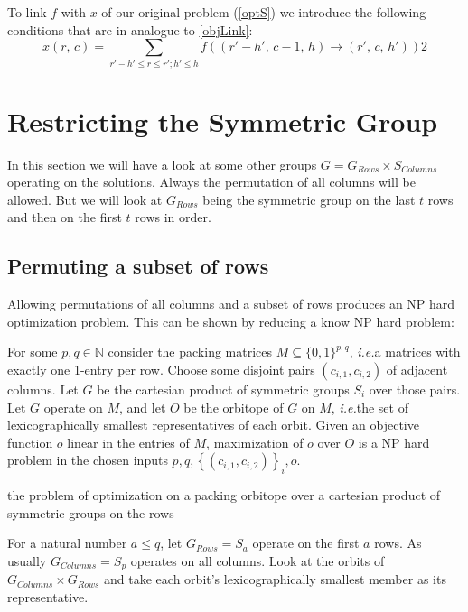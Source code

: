 \documentclass{amsart}
\theoremstyle{definition}
\def\ie{\emph{i.e.}}
\newcommand{\lr}[1]{\ensuremath{\left( #1 \right)}}
\newcommand{\lrM}[1]{\ensuremath{\left\{ #1 \right\}}}
\newcommand{\Naturals}{\ensuremath{\mathbb{N}}}
\begin{document}


To link \(f\) with \(x\) of our original problem (\ref{optS}) we
introduce the following conditions that are in analogue to \ref{objLink}:
\begin{equation}
  x \left( r,\, c \right) =
  \sum_{r' - h' \leq r \leq r'; h' \leq h} f\left(\left(r'-h',\, c-1,\, h\right)
    \rightarrow \left(r',\, c,\, h'\right) \right)
2\end{equation}

\section{Restricting the Symmetric Group}
In this section we will have a look at some other groups \(G =
G_{Rows} \times S_{Columns}\) operating on the solutions.  Always the
permutation of all columns will be allowed.  But we will look at
\(G_{Rows}\) being the symmetric group on the last \(t\) rows and then
on the first \(t\) rows in order.

\subsection{Permuting a subset of rows}

Allowing permutations of all columns and a subset of rows produces an
NP hard optimization problem.  This can be shown by reducing a know NP hard problem:

For some \(p,q \in \Naturals\) consider the packing matrices \(M
\subseteq \{0,1\}^{p,q}\), \ie a matrices with exactly one 1-entry per
row.  Choose some disjoint pairs \((c_{i,1}, c_{i,2})\) of adjacent
columns.  Let \(G\) be the cartesian product of symmetric groups
\(S_i\) over those pairs.  Let \(G\) operate on \(M\), and let \(O\)
be the orbitope of \(G\) on \(M\), \ie the set of lexicographically
smallest representatives of each orbit.  Given an objective function
\(o\) linear in the entries of \(M\), maximization of \(o\) over \(O\)
is a NP hard problem in the chosen inputs \(p,q,\lrM{\lr{c_{i,1},c_{i,2}}}_i, o\).

the
problem of optimization on a packing orbitope over a cartesian product
of symmetric groups on the rows

For a natural number \(a \leq q\), let \(G_{Rows} = S_a\) operate on
the first \(a\) rows.  As usually \(G_{Columns} = S_p\) operates on
all columns.  Look at the orbits of \(G_{Columns} \times G_{Rows}\)
and take each orbit's lexicographically smallest member as its
representative.
\end{document}
